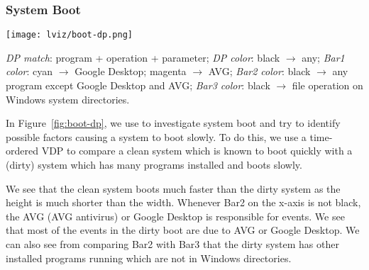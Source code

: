 \subsubsection{System Boot}
\label{sec:boot}

\begin{figure*}[htb]
\texttt{[image: lviz/boot-dp.png]}
\caption{Time-ordered VDP comparing boot
of a clean (Y axis) and a dirty (X axis) system.
}
\label{fig:boot-dp}
{\it DP match}: program + operation + parameter;
{\it DP color}: black $\rightarrow$ any;
{\it Bar1 color}: cyan $\rightarrow$ Google Desktop; magenta $\rightarrow$ AVG;
{\it Bar2 color}: black $\rightarrow$ any program except Google Desktop and AVG;
{\it Bar3 color}: black $\rightarrow$ file operation on Windows system directories.
\end{figure*}

In Figure~\ref{fig:boot-dp}, we use  to investigate system boot and try to identify possible
factors causing a system to boot slowly.
To do this, we use a time-ordered VDP to
compare a clean system which is known to boot quickly
with a (dirty) system which has many programs installed and boots slowly.

We see that the clean system boots much faster than the dirty system 
as the height is much shorter than the width.
Whenever Bar2 on the x-axis is not black,
the AVG (AVG antivirus) or Google Desktop is responsible for events.
We see that most of the events in the dirty boot are due to AVG or Google
Desktop.
We can also see from comparing Bar2 with Bar3
that the dirty system has other installed programs running
which are not in Windows directories.

